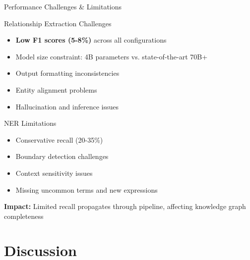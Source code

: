 \documentclass[aspectratio=169, 11pt]{beamer}
\begin{document}
\begin{frame}{Performance Challenges \& Limitations}
    \begin{block}{Relationship Extraction Challenges}
        \begin{itemize}
            \item \textbf{Low F1 scores (5-8\%)} across all configurations
            \item Model size constraint: 4B parameters vs. state-of-the-art 70B+
            \item Output formatting inconsistencies
            \item Entity alignment problems
            \item Hallucination and inference issues
        \end{itemize}
    \end{block}
    
    \begin{block}{NER Limitations}
        \begin{itemize}
            \item Conservative recall (20-35\%)
            \item Boundary detection challenges
            \item Context sensitivity issues
            \item Missing uncommon terms and new expressions
        \end{itemize}
    \end{block}
    
    \textbf{Impact:} Limited recall propagates through pipeline, affecting knowledge graph completeness
\end{frame}

\section{Discussion}
\end{document}
